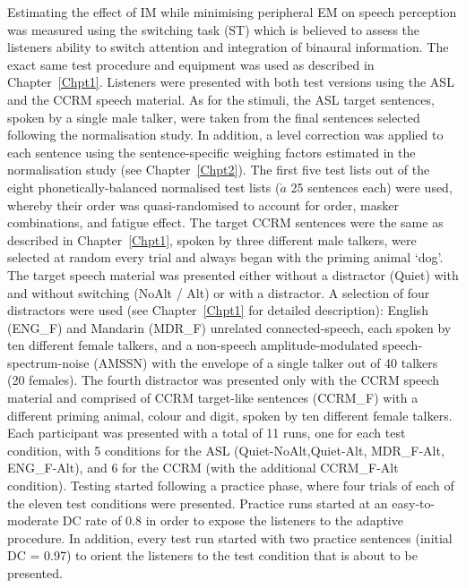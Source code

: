 \documentclass[a4paper, twoside]{templates/ociamthesis}
\begin{document}
\hfill\break
Estimating the effect of IM while minimising peripheral EM on speech perception was measured using the switching task (ST) which is believed to assess the listeners ability to switch attention and integration of binaural information. The exact same test procedure and equipment was used as described in Chapter~\ref{Chpt1}. Listeners were presented with both test versions using the ASL and the CCRM speech material. As for the stimuli, the ASL target sentences, spoken by a single male talker, were taken from the final sentences selected following the normalisation study. In addition, a level correction was applied to each sentence using the sentence-specific weighing factors estimated in the normalisation study (see Chapter~\ref{Chpt2}). The first five test lists out of the eight phonetically-balanced normalised test lists (\(\grave{a}\) 25 sentences each) were used, whereby their order was quasi-randomised to account for order, masker combinations, and fatigue effect. The target CCRM sentences were the same as described in Chapter~\ref{Chpt1}, spoken by three different male talkers, were selected at random every trial and always began with the priming animal `dog'. The target speech material was presented either without a distractor (Quiet) with and without switching (NoAlt / Alt) or with a distractor. A selection of four distractors were used (see Chapter~\ref{Chpt1} for detailed description): English (ENG\_F) and Mandarin (MDR\_F) unrelated connected-speech, each spoken by ten different female talkers, and a non-speech amplitude-modulated speech-spectrum-noise (AMSSN) with the envelope of a single talker out of 40 talkers (20 females). The fourth distractor was presented only with the CCRM speech material and comprised of CCRM target-like sentences (CCRM\_F) with a different priming animal, colour and digit, spoken by ten different female talkers. Each participant was presented with a total of 11 runs, one for each test condition, with 5 conditions for the ASL (Quiet-NoAlt,Quiet-Alt, MDR\_F-Alt, ENG\_F-Alt), and 6 for the CCRM (with the additional CCRM\_F-Alt condition). Testing started following a practice phase, where four trials of each of the eleven test conditions were presented. Practice runs started at an easy-to-moderate DC rate of 0.8 in order to expose the listeners to the adaptive procedure. In addition, every test run started with two practice sentences (initial DC = 0.97) to orient the listeners to the test condition that is about to be presented.\\
\end{document}
